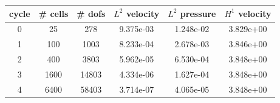 \documentclass[10pt]{report}
\begin{document}
\begin{table}[H]
\begin{center}
\begin{tabular}{|c|c|c|c|c|c|} \hline
cycle & \# cells & \# dofs & $L^2$ velocity & $L^2$ pressure & $H^1$ velocity\\ \hline
0 & 25 & 278 & 9.375e-03 & 1.248e-02 & 3.829e+00\\ \hline
1 & 100 & 1003 & 8.233e-04 & 2.678e-03 & 3.846e+00\\ \hline
2 & 400 & 3803 & 5.962e-05 & 6.530e-04 & 3.848e+00\\ \hline
3 & 1600 & 14803 & 4.334e-06 & 1.627e-04 & 3.848e+00\\ \hline
4 & 6400 & 58403 & 3.714e-07 & 4.065e-05 & 3.848e+00\\ \hline
\end{tabular}
\end{center}
\end{table}
\end{document}
